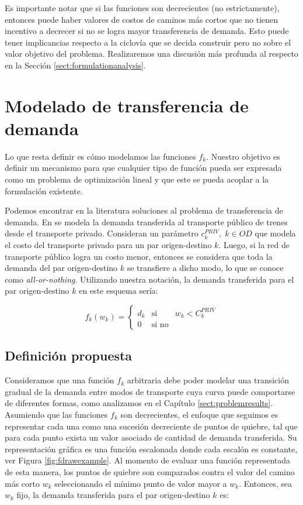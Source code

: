 Es importante notar que si las funciones son decrecientes (no estrictamente), entonces puede haber valores de costos de caminos más cortos que no tienen incentivo a decrecer si no se logra mayor transferencia de demanda. Esto puede tener implicancias respecto a la ciclovía que se decida construir pero no sobre el valor objetivo del problema. Realizaremos una discusión más profunda al respecto en la Sección \ref{sect:formulationanalysis}.

\section{Modelado de transferencia de demanda}
\label{sect:transferfunctiondefs}

Lo que resta definir es cómo modelamos las funciones $f_k$. Nuestro objetivo es definir un mecanismo para que cualquier tipo de función pueda ser expresada como un problema de optimización lineal y que este se pueda acoplar a la formulación existente.

Podemos encontrar en la literatura soluciones al problema de transferencia de demanda. En \parencite{laporte2007, marin2007} se modela la demanda transferida al transporte público de trenes desde el transporte privado. Consideran un parámetro $c^{PRIV}_k,\; k \in OD$ que modela el costo del transporte privado para un par origen-destino $k$. Luego, si la red de transporte público logra un costo menor, entonces se considera que toda la demanda del par origen-destino $k$ se transfiere a dicho modo, lo que se conoce como {\it all-or-nothing}. Utilizando nuestra notación, la demanda transferida para el par origen-destino $k$ en este esquema sería:

\begin{equation}
  \label{eq:allornothing}
  f_k(w_k) = \left\{ \begin{array}{lcr}
    d_k & \mbox{si}   & w_k < C^{PRIV}_k \\
          0 & \mbox{si no} &
  \end{array}
  \right.
\end{equation}

\subsection{Definición propuesta}

Consideramos que una función $f_k$ arbitraria debe poder modelar una transición gradual de la demanda entre modos de transporte cuya curva puede comportarse de diferentes formas, como analizamos en el Capítulo \ref{sect:problemresults}. Asumiendo que las funciones $f_k$ son decrecientes, el enfoque que seguimos es representar cada una como una sucesión decreciente de puntos de quiebre, tal que para cada punto exista un valor asociado de cantidad de demanda transferida. Su representación gráfica es una función escalonada donde cada escalón es constante, ver Figura \ref{fig:fdrawexample}. Al momento de evaluar una función representada de esta manera, los puntos de quiebre son comparados contra el valor del camino más corto $w_k$ seleccionando el mínimo punto de valor mayor a $w_k$. Entonces, sea $w_k$ fijo, la demanda transferida para el par origen-destino $k$ es:

